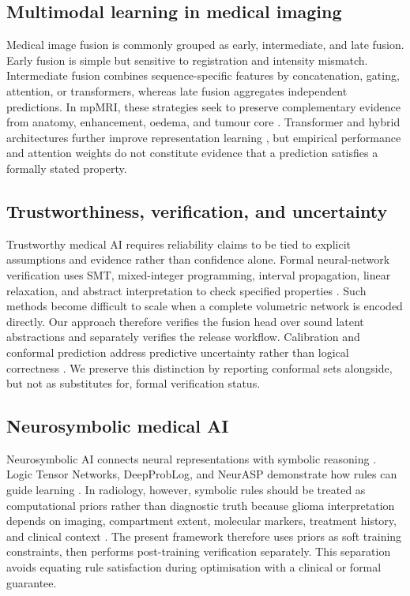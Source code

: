 \documentclass[preprint,11pt]{elsarticle}
\begin{document}
\subsection{Multimodal learning in medical imaging}
Medical image fusion is commonly grouped as early, intermediate, and late fusion. Early fusion is simple but sensitive to registration and intensity mismatch. Intermediate fusion combines sequence-specific features by concatenation, gating, attention, or transformers, whereas late fusion aggregates independent predictions. In mpMRI, these strategies seek to preserve complementary evidence from anatomy, enhancement, oedema, and tumour core \cite{baltrusaitis2019multimodal,li2022multimodal,zhou2019review}. Transformer and hybrid architectures further improve representation learning \cite{chen2021transunet,hatamizadeh2022unetr}, but empirical performance and attention weights do not constitute evidence that a prediction satisfies a formally stated property.

\subsection{Trustworthiness, verification, and uncertainty}
Trustworthy medical AI requires reliability claims to be tied to explicit assumptions and evidence rather than confidence alone. Formal neural-network verification uses SMT, mixed-integer programming, interval propagation, linear relaxation, and abstract interpretation to check specified properties \cite{katz2017reluplex,katz2019marabou,gehr2018ai2,singh2019abstract,zhang2018efficient}. Such methods become difficult to scale when a complete volumetric network is encoded directly. Our approach therefore verifies the fusion head over sound latent abstractions and separately verifies the release workflow. Calibration and conformal prediction address predictive uncertainty rather than logical correctness \cite{vovk2005algorithmic,angelopoulos2021gentle,romano2020classification}. We preserve this distinction by reporting conformal sets alongside, but not as substitutes for, formal verification status.

\subsection{Neurosymbolic medical AI}
Neurosymbolic AI connects neural representations with symbolic reasoning \cite{garcez2020neural,besold2017neural}. Logic Tensor Networks, DeepProbLog, and NeurASP demonstrate how rules can guide learning \cite{donadello2017ltn,badreddine2022logic,manhaeve2018deepproblog,yang2020neurasp}. In radiology, however, symbolic rules should be treated as computational priors rather than diagnostic truth because glioma interpretation depends on imaging, compartment extent, molecular markers, treatment history, and clinical context \cite{louis2021who,wen2010rano}. The present framework therefore uses priors as soft training constraints, then performs post-training verification separately. This separation avoids equating rule satisfaction during optimisation with a clinical or formal guarantee.
\end{document}
